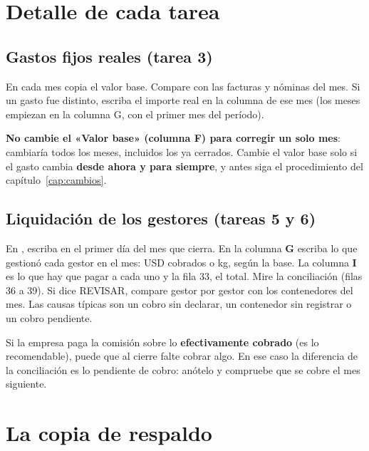\section{Detalle de cada tarea}

\subsection*{Gastos fijos reales (tarea 3)}
En  cada mes copia el valor base. Compare con las facturas y nóminas del mes. Si un gasto fue distinto, escriba el importe real
en la columna de ese mes (los meses empiezan en la columna G, con el primer mes del período).

\begin{atencion}
\textbf{No cambie el «Valor base» (columna F) para corregir un solo mes}: cambiaría todos los meses, incluidos los ya cerrados.
Cambie el valor base solo si el gasto cambia \textbf{desde ahora y para siempre}, y antes siga el procedimiento del capítulo~\ref{cap:cambios}.
\end{atencion}

\subsection*{Liquidación de los gestores (tareas 5 y 6)}
\begin{pasos}
\paso En , escriba en  el primer día del mes que cierra.
\paso En la columna \textbf{G} escriba lo que gestionó cada gestor en el mes: USD cobrados o kg, según la base.
\paso La columna \textbf{I} es lo que hay que pagar a cada uno y la fila 33, el total.
\paso Mire la conciliación (filas 36 a 39). Si dice REVISAR, compare gestor por gestor con los contenedores del mes.
      Las causas típicas son un cobro sin declarar, un contenedor sin registrar o un cobro pendiente.
\end{pasos}

\begin{nota}
Si la empresa paga la comisión sobre lo \textbf{efectivamente cobrado} (es lo recomendable), puede que al cierre falte cobrar algo.
En ese caso la diferencia de la conciliación es lo pendiente de cobro: anótelo y compruebe que se cobre el mes siguiente.
\end{nota}

\section{La copia de respaldo}\label{sec:respaldo}

